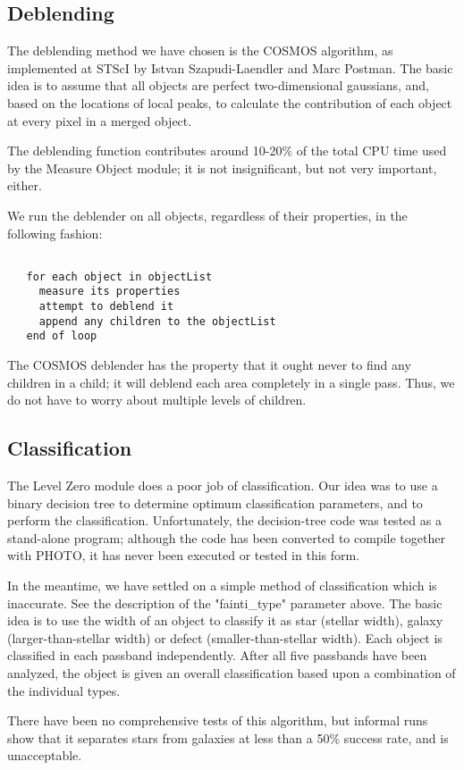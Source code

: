 \subsection{Deblending}

  The deblending method we have chosen is the COSMOS algorithm,
as implemented at STScI by Istvan Szapudi-Laendler and Marc
Postman.  The basic idea is to assume that all objects are 
perfect two-dimensional gaussians, and, based on the locations
of local peaks, to calculate the contribution of each object
at every pixel in a merged object.  

  The deblending function contributes around 10-20\% of the 
total CPU time used by the Measure Object module; it is not
insignificant, but not very important, either. 

  We run the deblender on all objects, regardless of their
properties, in the following fashion:

\begin{verbatim}

   for each object in objectList
     measure its properties
     attempt to deblend it
     append any children to the objectList
   end of loop

\end{verbatim}

  The COSMOS deblender has the property that it ought never to find
any children in a child; it will deblend each area completely in a
single pass.  Thus, we do not have to worry about multiple levels
of children.

\subsection{Classification}

  The Level Zero module does a poor job of classification.
Our idea was to use a binary decision tree to determine optimum
classification parameters, and to perform the classification.
Unfortunately, the decision-tree code was tested as a stand-alone
program; although the code has been converted to compile together
with PHOTO, it has never been executed or tested in this form.

  In the meantime, we have settled on a simple method of classification
which is inaccurate.  See the description of the "fainti\_type"
parameter above.  The basic idea is to use the width of an object
to classify it as star (stellar width), galaxy (larger-than-stellar
width) or defect (smaller-than-stellar width).  Each object is 
classified in each passband independently.  After all five
passbands have been analyzed, the object is given an overall
classification based upon a combination of the individual types.

  There have been no comprehensive tests of this algorithm,
but informal runs show that it separates stars from galaxies
at less than a 50\% success rate, and is unacceptable.

